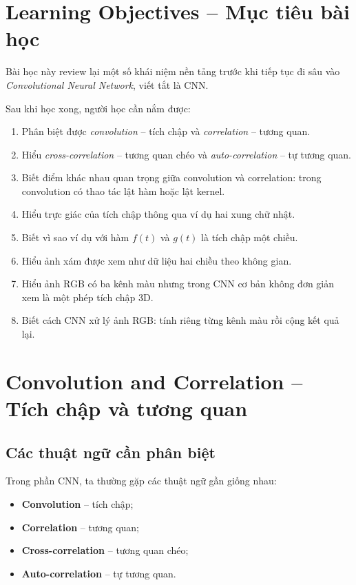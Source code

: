 \section*{Learning Objectives -- Mục tiêu bài học}

Bài học này review lại một số khái niệm nền tảng trước khi tiếp tục đi sâu vào \textit{Convolutional Neural Network}, viết tắt là CNN.

Sau khi học xong, người học cần nắm được:

\begin{enumerate}[label=\arabic*.]
    \item Phân biệt được \textit{convolution} -- tích chập và \textit{correlation} -- tương quan.
    \item Hiểu \textit{cross-correlation} -- tương quan chéo và \textit{auto-correlation} -- tự tương quan.
    \item Biết điểm khác nhau quan trọng giữa convolution và correlation: trong convolution có thao tác lật hàm hoặc lật kernel.
    \item Hiểu trực giác của tích chập thông qua ví dụ hai xung chữ nhật.
    \item Biết vì sao ví dụ với hàm $f(t)$ và $g(t)$ là tích chập một chiều.
    \item Hiểu ảnh xám được xem như dữ liệu hai chiều theo không gian.
    \item Hiểu ảnh RGB có ba kênh màu nhưng trong CNN cơ bản không đơn giản xem là một phép tích chập 3D.
    \item Biết cách CNN xử lý ảnh RGB: tính riêng từng kênh màu rồi cộng kết quả lại.
\end{enumerate}

\section{Convolution and Correlation -- Tích chập và tương quan}

\subsection{Các thuật ngữ cần phân biệt}

Trong phần CNN, ta thường gặp các thuật ngữ gần giống nhau:

\begin{itemize}
    \item \textbf{Convolution} -- tích chập;
    \item \textbf{Correlation} -- tương quan;
    \item \textbf{Cross-correlation} -- tương quan chéo;
    \item \textbf{Auto-correlation} -- tự tương quan.
\end{itemize}

